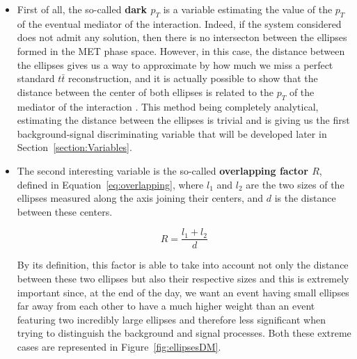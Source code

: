 \documentclass[a4paper, 10pt, openright]{report}
\begin{document}
\begin{itemize}
\item First of all, the so-called \textbf{dark $p_T$} is a variable estimating the value of the $p_T$ of the eventual mediator of the interaction. Indeed, if the system considered does not admit any solution, then there is no intersecton between the ellipses formed in the \ac{MET} phase space. However, in this case, the distance between the ellipses gives us a way to approximate by how much we miss a perfect standard $t \bar t$ reconstruction, and it is actually possible to show that the distance between the center of both ellipses is related to the $p_T$ of the mediator of the interaction \cite{Agustin}. This method being completely analytical, estimating the distance between the ellipses is trivial and is giving us the first background-signal discriminating variable that will be developed later in Section~\ref{section:Variables}.
\item The second interesting variable is the so-called \textbf{overlapping factor $R$}, defined in Equation~\ref{eq:overlapping}, where $l_1$ and $l_2$ are the two sizes of the ellipses measured along the axis joining their centers, and $d$ is the distance between these centers.

\begin{equation}
\label{eq:overlapping}
R = \frac{l_1 + l_2}{d}
\end{equation}

By its definition, this factor is able to take into account not only the distance between these two ellipses but also their respective sizes and this is extremely important since, at the end of the day, we want an event having small ellipses far away from each other to have a much higher weight than an event featuring two incredibly large ellipses and therefore less significant when trying to distinguish the background and signal processes. Both these extreme cases are represented in Figure~\ref{fig:ellipsesDM}.


\end{itemize}
\end{document}
